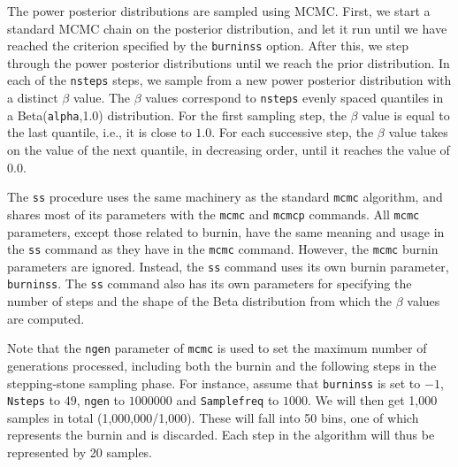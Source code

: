 \documentclass[12pt]{book}
\begin{document}
The power posterior distributions are sampled using MCMC. First, we start a standard MCMC chain on
the posterior distribution, and let it run until we have reached the criterion specified by the
\texttt{burninss} option. After this, we step through the power posterior distributions until we
reach the prior distribution. In each of the \texttt{nsteps} steps, we sample from a new power
posterior distribution with a distinct $\beta$ value. The $\beta$ values correspond to
\texttt{nsteps} evenly spaced quantiles in a Beta(\texttt{alpha},1.0) distribution. For the first
sampling step, the $\beta$ value is equal to the last quantile, i.e., it is close to $1.0$. For
each successive step, the $\beta$ value takes on the value of the next quantile, in decreasing
order, until it reaches the value of $0.0$.

The \texttt{ss} procedure uses the same machinery as the standard \texttt{mcmc} algorithm, and
shares most of its parameters with the \texttt{mcmc} and \texttt{mcmcp} commands. All \texttt{mcmc}
parameters, except those related to burnin, have the same meaning and usage in the \texttt{ss}
command as they have in the \texttt{mcmc} command. However, the \texttt{mcmc} burnin parameters are
ignored. Instead, the \texttt{ss} command uses its own burnin parameter, \texttt{burninss}. The
\texttt{ss} command also has its own parameters for specifying the number of steps and the shape of
the Beta distribution from which the $\beta$ values are computed.

Note that the \texttt{ngen} parameter of \texttt{mcmc} is used to set the maximum number of
generations processed, including both the burnin and the following steps in the stepping-stone
sampling phase.  For instance, assume that \texttt{burninss} is set to $-1$, \texttt{Nsteps} to
$49$, \texttt{ngen} to $1000000$ and \texttt{Samplefreq} to $1000$. We will then get 1,000 samples
in total (1,000,000/1,000). These will fall into 50 bins, one of which represents the burnin and
is discarded. Each step in the algorithm will thus be represented by 20 samples.
\end{document}
